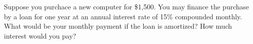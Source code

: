 \documentclass[11pt,epsfig]{article}
\begin{document}
\begin{problem}{14}
Suppose you purchace a new computer for \$1,500. You may finance the purchase by a loan for one year at an annual interest rate of 15\% compounded monthly. What would be your monthly payment if the loan is amortized? How much interest would you pay?

\vfill
\end{problem}

\showpoints
\end{document}
